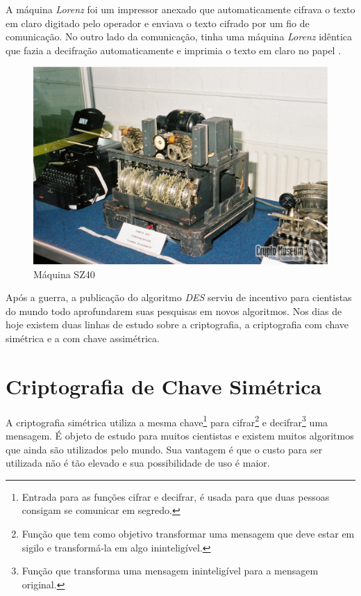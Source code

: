 A máquina \textit{Lorenz} foi um impressor anexado que automaticamente cifrava o texto em claro digitado pelo operador e enviava o texto cifrado por um fio de comunicação. No outro lado da comunicação, tinha uma máquina \textit{Lorenz} idêntica que fazia a decifração automaticamente e imprimia o texto em claro no papel \cite{chris-collins}.

\begin{figure}[h]
  \centering
  \includegraphics[keepaspectratio=true,scale=0.2]
  {figuras/sz40.eps}
  \caption[{Máquina SZ40}]{Máquina SZ40\protect\footnotemark}
    \label{sz40-machine}
\end{figure}

Após a guerra, a publicação do algoritmo \textit{DES} serviu de incentivo para cientistas do mundo todo aprofundarem suas pesquisas em novos algoritmos. Nos dias de hoje existem duas linhas de estudo sobre a criptografia, a criptografia com chave simétrica e a com chave assimétrica. 


\section{Criptografia de Chave Simétrica}
\label{symmetric-cryptography}

A criptografia simétrica utiliza a mesma chave\footnote{Entrada para as funções cifrar e decifrar, é usada para que duas pessoas consigam se comunicar em segredo.} para cifrar\footnote{Função que tem como objetivo transformar uma mensagem que deve estar em sigilo e transformá-la em algo ininteligível.} e decifrar\footnote{Função que transforma uma mensagem ininteligível para a mensagem original.} uma mensagem. É objeto de estudo para muitos cientistas e existem muitos algoritmos que ainda são utilizados pelo mundo. Sua vantagem é que o custo para ser utilizada não é tão elevado e sua possibilidade de uso é maior.

